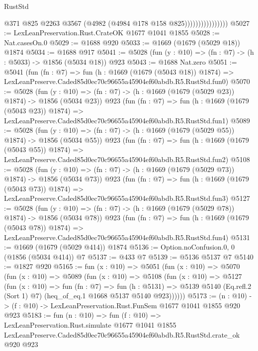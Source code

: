 \begin{lexlean}{RustStd}
\begin{coremodule}
                                @371
                                @825
                                @2263
                                @3567
                                (@4982 (@4984 @178 @158 @825))))))))))))))))
@5027 := LexLeanPreservation.Rust.CrateOK @1677 @1041 @1855
@5028 := Nat.casesOn.{0}
@5029 := @1688 @920
@5033 := @1669 (@1679 (@5029 @18)) @1874
@5034 := @1688 @917
@5041 := @5028 (fun (y : @10) => (fn : @7) -> (h : @5033) -> @1856 (@5034 @18)) @923
@5043 := @1688 Nat.zero
@5051 := @5041
    (fun (fn : @7) =>
    fun (h : @1669 (@1679 (@5043 @18)) @1874) =>
    LexLeanPreserve.Caded85d0ec70c96655a45904ef60abdb.R5.RustStd.fun0)
@5070 := @5028
    (fun (y : @10) => (fn : @7) -> (h : @1669 (@1679 (@5029 @23)) @1874) -> @1856 (@5034 @23))
    @923
    (fun (fn : @7) =>
    fun (h : @1669 (@1679 (@5043 @23)) @1874) =>
    LexLeanPreserve.Caded85d0ec70c96655a45904ef60abdb.R5.RustStd.fun1)
@5089 := @5028
    (fun (y : @10) => (fn : @7) -> (h : @1669 (@1679 (@5029 @55)) @1874) -> @1856 (@5034 @55))
    @923
    (fun (fn : @7) =>
    fun (h : @1669 (@1679 (@5043 @55)) @1874) =>
    LexLeanPreserve.Caded85d0ec70c96655a45904ef60abdb.R5.RustStd.fun2)
@5108 := @5028
    (fun (y : @10) => (fn : @7) -> (h : @1669 (@1679 (@5029 @73)) @1874) -> @1856 (@5034 @73))
    @923
    (fun (fn : @7) =>
    fun (h : @1669 (@1679 (@5043 @73)) @1874) =>
    LexLeanPreserve.Caded85d0ec70c96655a45904ef60abdb.R5.RustStd.fun3)
@5127 := @5028
    (fun (y : @10) => (fn : @7) -> (h : @1669 (@1679 (@5029 @78)) @1874) -> @1856 (@5034 @78))
    @923
    (fun (fn : @7) =>
    fun (h : @1669 (@1679 (@5043 @78)) @1874) =>
    LexLeanPreserve.Caded85d0ec70c96655a45904ef60abdb.R5.RustStd.fun4)
@5131 := @1669 (@1679 (@5029 @414)) @1874
@5136 := Option.noConfusion.{0, 0} (@1856 (@5034 @414)) @7
@5137 := @433 @7
@5139 := @5136 @5137 @7
@5140 := @1827 @920
@5165 := fun (x : @10) =>
  @5051
    (fun (x : @10) =>
    @5070
      (fun (x : @10) =>
      @5089
        (fun (x : @10) =>
        @5108
          (fun (x : @10) =>
          @5127
            (fun (x : @10) =>
            fun (fn : @7) =>
            fun (h : @5131) =>
            @5139 @5140 (Eq.refl.{2} (Sort 1) @7) (heq_of_eq.{1} @1668 @5137 @5140 @923))))))
@5173 := (n : @10) -> (f : @10) -> LexLeanPreservation.Rust.FunSem @1677 @1041 @1855 @920 @923
@5183 := fun (n : @10) =>
  fun (f : @10) =>
  LexLeanPreservation.Rust.simulate
    @1677
    @1041
    @1855
    LexLeanPreserve.Caded85d0ec70c96655a45904ef60abdb.R5.RustStd.crate_ok
    @920
    @923
\end{coremodule}
\end{lexlean}
